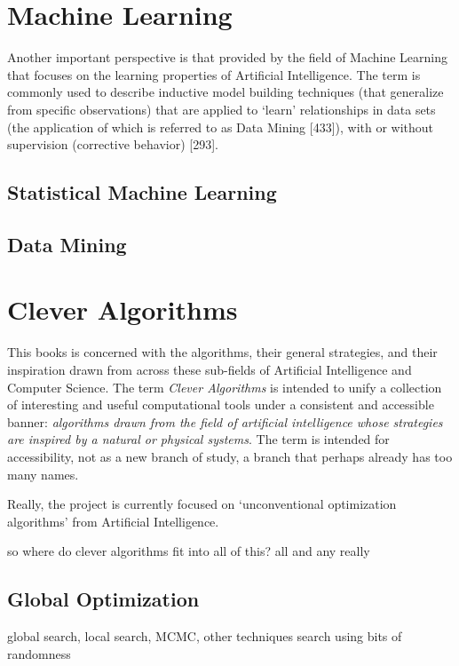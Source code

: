 \documentclass[a4paper, 11pt]{article}
\begin{document}
% 
% 
\section{Machine Learning}
\label{sec:machine_learning}
Another important perspective is that provided by the field of Machine Learning that focuses on the learning properties of Artificial Intelligence. The term is commonly used to describe inductive model building techniques (that generalize from specific observations) that are applied to ‘learn’ relationships in data sets (the application of which is referred to as Data Mining [433]), with or without supervision (corrective behavior) [293].

\subsection{Statistical Machine Learning}

\subsection{Data Mining}

% 
% 
\section{Clever Algorithms}
\label{sec:clever_algorithms}
This books is concerned with the algorithms, their general strategies, and their inspiration drawn from across these sub-fields of Artificial Intelligence and Computer Science. The term \emph{Clever Algorithms} is intended to unify a collection of interesting and useful computational tools under a consistent and accessible banner: \emph{algorithms drawn from the field of artificial intelligence whose strategies are inspired by a natural or physical systems}. The term is intended for accessibility, not as a new branch of study, a branch that perhaps already has too many names.

Really, the project is currently focused on `unconventional optimization algorithms' from Artificial Intelligence.

so where do clever algorithms fit into all of this?
all and any really


\subsection{Global Optimization}
global search, local search, MCMC, other techniques
search using bits of randomness




\end{document}
